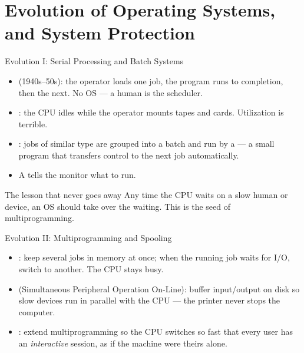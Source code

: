 \documentclass[aspectratio=169]{beamer}
\begin{document}

\section{Evolution of Operating Systems, and System Protection}

\begin{frame}{Evolution I: Serial Processing and Batch Systems}
  \begin{itemize}
    \item {} (1940s--50s): the operator loads one job,
      the program runs to completion, then the next. No OS --- a human is the
      scheduler.
    \item {}: the CPU idles while the operator mounts tapes and
      cards. Utilization is terrible.
    \item {}: jobs of similar type are grouped into a
      batch and run by a  --- a small program that
      transfers control to the next job automatically.
    \item A  tells the monitor what to run.
  \end{itemize}
  \vspace{0.2cm}
  \begin{alertblock}{The lesson that never goes away}
    Any time the CPU waits on a slow human or device, an OS should take over the
    waiting. This is the seed of multiprogramming.
  \end{alertblock}
  \vspace{0.1cm}
\end{frame}

\begin{frame}{Evolution II: Multiprogramming and Spooling}
  \begin{itemize}
    \item {}: keep several jobs in memory at once; when the
      running job waits for I/O, switch to another. The CPU stays busy.
    \item {} (Simultaneous Peripheral Operation On-Line): buffer
      input/output on disk so slow devices run in parallel with the CPU --- the
      printer never stops the computer.
    \item {}: extend multiprogramming so the CPU
      switches so fast that every user has an \emph{interactive} session,
      as if the machine were theirs alone.
  \end{itemize}
  \vspace{0.2cm}
\end{frame}
\end{document}
